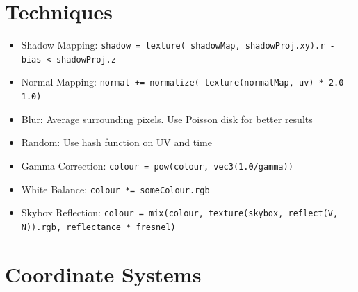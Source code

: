 \documentclass{article}
\begin{document}
\begin{landscape}
\begin{multicols}{3}
            \section{Techniques}
            \begin{itemize}
                \item \RaggedRight Shadow Mapping: \texttt{shadow = texture( shadowMap, shadowProj.xy).r - bias < shadowProj.z }
                \item Normal Mapping: \texttt{normal += normalize( texture(normalMap, uv) * 2.0 - 1.0)}
                \item Blur: Average surrounding pixels. Use Poisson disk for better results
                \item Random: Use hash function on UV and time
                \item Gamma Correction: \texttt{colour = pow(colour, vec3(1.0/gamma))}
                \item White Balance: \texttt{colour *= someColour.rgb}
                \item Skybox Reflection: \texttt{colour = mix(colour, texture(skybox, reflect(V, N)).rgb, reflectance * fresnel)}
            \end{itemize}

	    \section{Coordinate Systems}

\end{multicols}
\end{landscape}
\end{document}
